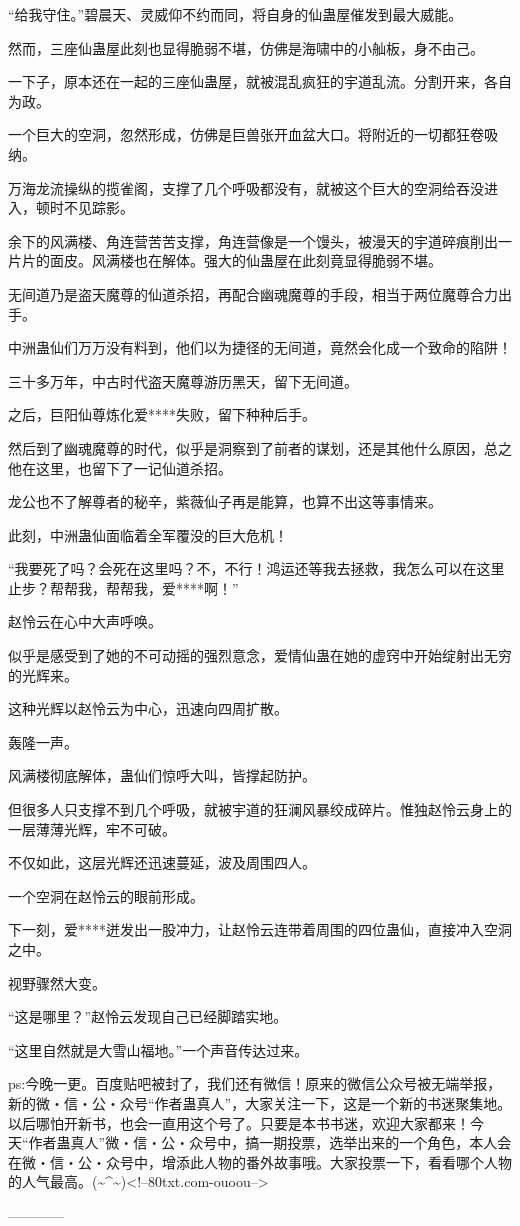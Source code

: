 \begin{this_body}
“给我守住。”碧晨天、灵威仰不约而同，将自身的仙蛊屋催发到最大威能。

然而，三座仙蛊屋此刻也显得脆弱不堪，仿佛是海啸中的小舢板，身不由己。

一下子，原本还在一起的三座仙蛊屋，就被混乱疯狂的宇道乱流。分割开来，各自为政。

一个巨大的空洞，忽然形成，仿佛是巨兽张开血盆大口。将附近的一切都狂卷吸纳。

万海龙流操纵的揽雀阁，支撑了几个呼吸都没有，就被这个巨大的空洞给吞没进入，顿时不见踪影。

余下的风满楼、角连营苦苦支撑，角连营像是一个馒头，被漫天的宇道碎痕削出一片片的面皮。风满楼也在解体。强大的仙蛊屋在此刻竟显得脆弱不堪。

无间道乃是盗天魔尊的仙道杀招，再配合幽魂魔尊的手段，相当于两位魔尊合力出手。

中洲蛊仙们万万没有料到，他们以为捷径的无间道，竟然会化成一个致命的陷阱！

三十多万年，中古时代盗天魔尊游历黑天，留下无间道。

之后，巨阳仙尊炼化爱****失败，留下种种后手。

然后到了幽魂魔尊的时代，似乎是洞察到了前者的谋划，还是其他什么原因，总之他在这里，也留下了一记仙道杀招。

龙公也不了解尊者的秘辛，紫薇仙子再是能算，也算不出这等事情来。

此刻，中洲蛊仙面临着全军覆没的巨大危机！

“我要死了吗？会死在这里吗？不，不行！鸿运还等我去拯救，我怎么可以在这里止步？帮帮我，帮帮我，爱****啊！”

赵怜云在心中大声呼唤。

似乎是感受到了她的不可动摇的强烈意念，爱情仙蛊在她的虚窍中开始绽射出无穷的光辉来。

这种光辉以赵怜云为中心，迅速向四周扩散。

轰隆一声。

风满楼彻底解体，蛊仙们惊呼大叫，皆撑起防护。

但很多人只支撑不到几个呼吸，就被宇道的狂澜风暴绞成碎片。惟独赵怜云身上的一层薄薄光辉，牢不可破。

不仅如此，这层光辉还迅速蔓延，波及周围四人。

一个空洞在赵怜云的眼前形成。

下一刻，爱****迸发出一股冲力，让赵怜云连带着周围的四位蛊仙，直接冲入空洞之中。

视野骤然大变。

“这是哪里？”赵怜云发现自己已经脚踏实地。

“这里自然就是大雪山福地。”一个声音传达过来。

ps:今晚一更。百度贴吧被封了，我们还有微信！原来的微信公众号被无端举报，新的微・信・公・众号“作者蛊真人”，大家关注一下，这是一个新的书迷聚集地。以后哪怕开新书，也会一直用这个号了。只要是本书书迷，欢迎大家都来！今天“作者蛊真人”微・信・公・众号中，搞一期投票，选举出来的一个角色，本人会在微・信・公・众号中，增添此人物的番外故事哦。大家投票一下，看看哪个人物的人气最高。(\~{}\^{}\~{})<!--80txt.com-ouoou-->

------------

\end{this_body}

